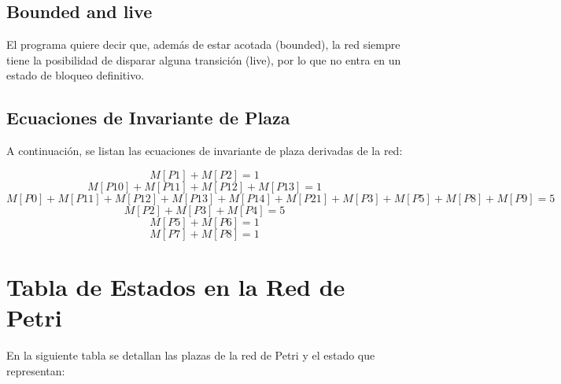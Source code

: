 \documentclass[12pt]{article}
\begin{document}
\subsection{Bounded and live}
El programa quiere decir que, además de estar acotada (bounded), la red siempre tiene la posibilidad de disparar alguna transición (live), por lo que no entra en un estado de bloqueo definitivo.
\newpage

\subsection{Ecuaciones de Invariante de Plaza}
A continuación, se listan las ecuaciones de invariante de plaza derivadas de la red:

\[
M[P1] + M[P2] = 1
\]
\[
M[P10] + M[P11] + M[P12] + M[P13] = 1
\]
\[
M[P0] + M[P11] + M[P12] + M[P13] + M[P14] + M[P21] + M[P3] + M[P5] + M[P8] + M[P9] = 5
\]
\[
M[P2] + M[P3] + M[P4] = 5
\]
\[
M[P5] + M[P6] = 1
\]
\[
M[P7] + M[P8] = 1
\]

\section{Tabla de Estados en la Red de Petri}
En la siguiente tabla se detallan las plazas de la red de Petri y el estado que representan:
\end{document}
